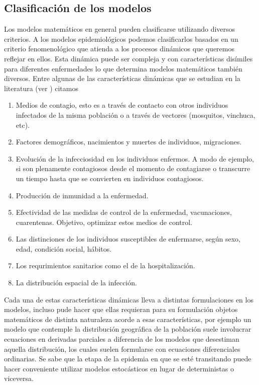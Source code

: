 \documentclass{article}
\begin{document}
 

\subsection{Clasificación de los modelos} \label{clasif}

Los modelos matemáticos en general  pueden clasificarse utilizando diversos criterios. A los modelos epidemiológicos podemos clasificarlos basados en un criterio fenomenológico que atienda a los procesos dinámicos que queremos reflejar en ellos. Esta dinámica puede ser compleja y con características disímiles para diferentes enfermedades lo que determina modelos matemáticos también diversos. Entre algunas de las características dinámicas que se  estudian en la literatura (ver \cite{FredBrauer}) citamos

\begin{enumerate}
 \item Medios de contagio, esto es a través de contacto con otros individuos infectados de la misma población o a través de vectores (mosquitos, vinchuca, etc).
 \item Factores demográficos, nacimientos y muertes de individuos, migraciones.
 \item Evolución de la infecciosidad en los individuos enfermos.  A modo de ejemplo, si son plenamente contagiosos desde el momento de contagiarse o transcurre un tiempo hasta que se convierten en individuos contagiosos.
 \item Producción de inmunidad a la enfermedad.
 \item Efectividad  de las medidas de control de la enfermedad, vacunaciones, cuarentenas. Objetivo, optimizar estos medios de control.
 \item Las distinciones de los individuos susceptibles de enfermarse, según sexo, edad, condición social, hábitos.
 \item Los requrimientos sanitarios como el de la hospitalización. 
 \item La distribución espacial de la infección.
 
 \end{enumerate}
 
 Cada una de estas características dinámicas lleva a distintas formulaciones en los  modelos, incluso pude hacer que ellas requieran para su formulación objetos matemáticos de distinta naturaleza  acorde a esas características, por ejemplo un modelo que contemple la distribución geográfica de la población suele involucrar ecuaciones en derivadas parciales a diferencia de los modelos que desestiman aquella distribución, los cuales suelen formularse con ecuaciones diferenciales ordinarias. Se sabe que la etapa de la epidemia en que se esté transitando puede hacer conveniente utilizar modelos estocásticos en lugar de deterministas o viceversa.
 
\end{document}
